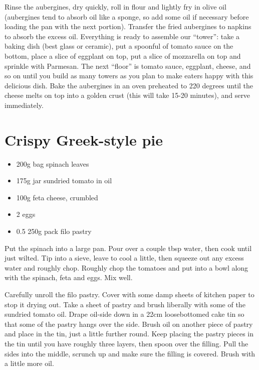 \documentclass[
]{book}
\providecommand{\tightlist}{%
  \setlength{\itemsep}{0pt}\setlength{\parskip}{0pt}}
\begin{document}
Rinse the aubergines, dry quickly, roll in flour and lightly fry in olive oil (aubergines tend to absorb oil like a sponge, so add some oil if necessary before loading the pan with the next portion). Transfer the fried aubergines to napkins to absorb the excess oil. Everything is ready to assemble our ``tower'': take a baking dish (best glass or ceramic), put a spoonful of tomato sauce on the bottom, place a slice of eggplant on top, put a slice of mozzarella on top and sprinkle with Parmesan. The next ``floor'' is tomato sauce, eggplant, cheese, and so on until you build as many towers as you plan to make eaters happy with this delicious dish. Bake the aubergines in an oven preheated to 220 degrees until the cheese melts on top into a golden crust (this will take 15-20 minutes), and serve immediately.

\hypertarget{crispy-greek-style-pie}{%
\section{Crispy Greek-style pie}\label{crispy-greek-style-pie}}

\begin{itemize}
\tightlist
\item
  200g bag spinach leaves
\item
  175g jar sundried tomato in oil
\item
  100g feta cheese, crumbled
\item
  2 eggs
\item
  0.5 250g pack filo pastry
\end{itemize}

Put the spinach into a large pan. Pour over a couple tbsp water, then cook until just wilted. Tip into a sieve, leave to cool a little, then squeeze out any excess water and roughly chop. Roughly chop the tomatoes and put into a bowl along with the spinach, feta and eggs. Mix well.

Carefully unroll the filo pastry. Cover with some damp sheets of kitchen paper to stop it drying out. Take a sheet of pastry and brush liberally with some of the sundried tomato oil. Drape oil-side down in a 22cm loosebottomed cake tin so that some of the pastry hangs over the side. Brush oil on another piece of pastry and place in the tin, just a little further round. Keep placing the pastry pieces in the tin until you have roughly three layers, then spoon over the filling. Pull the sides into the middle, scrunch up and make sure the filling is covered. Brush with a little more oil.
\end{document}
